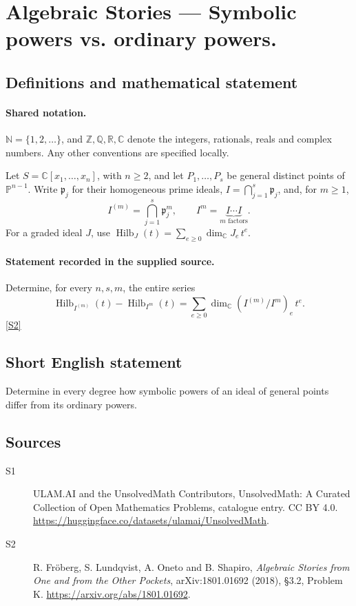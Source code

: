 \documentclass[11pt]{article}
\newcommand{\sref}[2]{\hyperlink{source:#1:#2}{[S#2]}}
\begin{document}
\section{Algebraic Stories — Symbolic powers vs. ordinary powers.}\label{statement}

\subsection{Definitions and mathematical statement}

\paragraph{Shared notation.}$\mathbb N=\{1,2,\ldots\}$, and $\mathbb Z,\mathbb Q,\mathbb R,\mathbb C$ denote the integers, rationals, reals and complex numbers. Any other conventions are specified locally.


Let $S=\mathbb C[x_1,\ldots,x_n]$, with $n\geq2$, and let $P_1,\ldots,P_s$ be general distinct points of $\mathbb P^{n-1}$. Write $\mathfrak p_j$ for their homogeneous prime ideals, $I=\bigcap_{j=1}^s\mathfrak p_j$, and, for $m\geq1$,
\[I^{(m)}=\bigcap_{j=1}^s\mathfrak p_j^m,\qquad I^m=\underbrace{I\cdots I}_{m\text{ factors}}.
\]
For a graded ideal $J$, use $\operatorname{Hilb}_J(t)=\sum_{e\geq0}\dim_{\mathbb C}J_e\,t^e$.
\paragraph{Statement recorded in the supplied source.}
Determine, for every $n,s,m$, the entire series
\[\operatorname{Hilb}_{I^{(m)}}(t)-\operatorname{Hilb}_{I^m}(t)
 =\sum_{e\geq0}\dim_{\mathbb C}(I^{(m)}/I^m)_e\,t^e.
\] \sref{statement}{2}
\subsection{Short English statement}
Determine in every degree how symbolic powers of an ideal of general points differ from its ordinary powers.
\subsection{Sources}
\begin{description}
\item[\hypertarget{source:statement:1}{S1}] ULAM.AI and the UnsolvedMath Contributors, UnsolvedMath: A Curated Collection of Open Mathematics Problems, catalogue entry. CC BY 4.0. \url{https://huggingface.co/datasets/ulamai/UnsolvedMath}.
\item[\hypertarget{source:statement:2}{S2}] R. Fröberg, S. Lundqvist, A. Oneto and B. Shapiro, \emph{Algebraic Stories from One and from the Other Pockets}, arXiv:1801.01692 (2018), §3.2, Problem K. \url{https://arxiv.org/abs/1801.01692}.
\end{description}
\label{end:statement}
\end{document}
